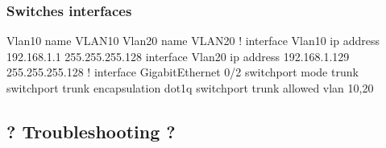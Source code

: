 \subsubsection{Switches interfaces}

\begin{txt}
    Vlan10
    name VLAN10
    Vlan20
    name VLAN20
    !
    interface Vlan10
    ip address 192.168.1.1 255.255.255.128
    interface Vlan20
    ip address 192.168.1.129 255.255.255.128
    !
    interface GigabitEthernet 0/2
    switchport mode trunk
    switchport trunk encapsulation dot1q
    switchport trunk allowed vlan 10,20
\end{txt}

\pagebreak


\pagebreak

\subsection{? Troubleshooting ?}

